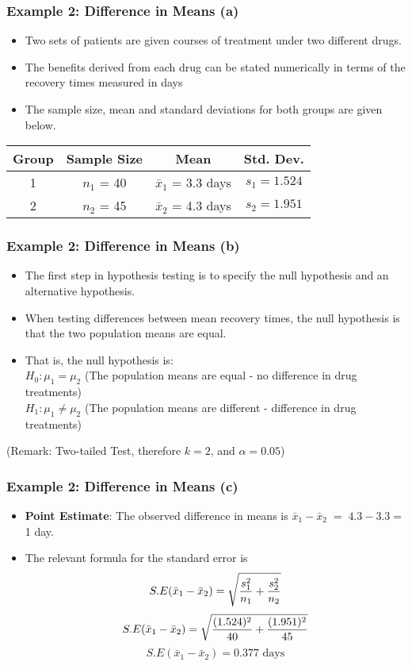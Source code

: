\documentclass[a4]{beamer}
\begin{document}
\begin{frame}
\frametitle{Example 2: Difference in Means (a) }
\begin{itemize}
\item Two sets of patients are given courses of treatment under two different drugs. \item 
The benefits
derived from each drug can be stated numerically in terms of the recovery times measured in days
\item The sample size, mean and standard deviations for both groups are given below.
\end{itemize}
\begin{tabular}{|c|c|c|c|}
\hline Group & Sample Size & Mean & Std. Dev.  \\ 
\hline 1 & $n_1$ = 40 & $\bar{x}_1$ = 3.3 days  &  $s_1 = 1.524$ \\ 
\hline 2 & $n_2$ = 45 & $\bar{x}_2$ = 4.3 days & $s_2 = 1.951 $ \\ 
\hline 
\end{tabular} 

\end{frame}

\begin{frame}
\frametitle{Example 2: Difference in Means (b) }
\begin{itemize}
\item
The first step in hypothesis testing is to specify the null hypothesis and an alternative hypothesis.
\item When testing differences between mean recovery times, the null hypothesis is that the two population means are equal.
\item That is, the null hypothesis is:\\
$H_0: \mu_1 = \mu_2$ (The population means are equal - no difference in drug treatments)\\
$H_1: \mu_1 \neq \mu_2$ (The population means are different - difference in drug treatments)\\
\end{itemize}
(Remark: Two-tailed Test, therefore $k = 2$, and $\alpha = 0.05$)
\end{frame}

\begin{frame}
\frametitle{Example 2: Difference in Means (c) }
\begin{itemize}
\item \textbf{Point Estimate}: The observed difference in means is $\bar{x}_1-\bar{x}_2 \;= \;4.3-3.3 \;$= 1 day.
\vspace{0.2cm}
\item The relevant formula for the standard error is
\[ S.E(\bar{x}_1 - \bar{x}_2) = \sqrt{{s^2_1\over n_1}+{s^2_2 \over n_2}} \]
 \[ S.E(\bar{x}_1 - \bar{x}_2) = \sqrt{{(1.524)^2 \over 40}+{(1.951)^2 \over 45}}   \]\vspace{0.2cm}
 \[ S.E(\bar{x}_1 - \bar{x}_2) = 0.377\mbox{ days}\]
\end{itemize}
\end{frame}
\end{document}

